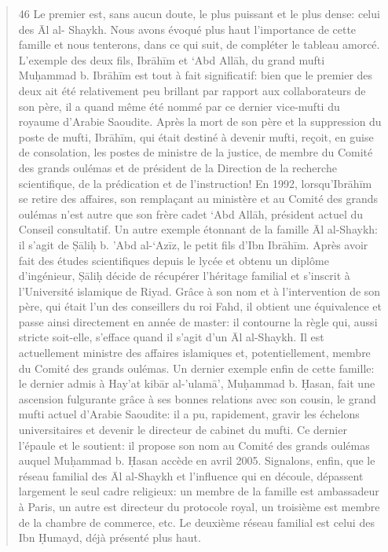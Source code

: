 \begin{quote}
46 Le premier est, sans aucun doute, le plus puissant et le plus dense:
celui des Āl al- Shaykh. Nous avons évoqué plus haut l'importance de
cette famille et nous tenterons, dans ce qui suit, de compléter le
tableau amorcé. L'exemple des deux fils, Ibrāhīm et `Abd Allāh, du grand
mufti Muḥammad b. Ibrāhīm est tout à fait significatif: bien que le
premier des deux ait été relativement peu brillant par rapport aux
collaborateurs de son père, il a quand même été nommé par ce dernier
vice-mufti du royaume d'Arabie Saoudite. Après la mort de son père et la
suppression du poste de mufti, Ibrāhīm, qui était destiné à devenir
mufti, reçoit, en guise de consolation, les postes de ministre de la
justice, de membre du Comité des grands oulémas et de président de la
Direction de la recherche scientifique, de la prédication et de
l'instruction! En 1992, lorsqu'Ibrāhīm se retire des affaires, son
remplaçant au ministère et au Comité des grands oulémas n'est autre que
son frère cadet `Abd Allāh, président actuel du Conseil consultatif. Un
autre exemple étonnant de la famille Āl al-Shaykh: il s'agit de Ṣāliḥ b.
'Abd al-`Azīz, le petit fils d'Ibn Ibrāhīm. Après avoir fait des études
scientifiques depuis le lycée et obtenu un diplôme d'ingénieur, Ṣāliḥ
décide de récupérer l'héritage familial et s'inscrit à l'Université
islamique de Riyad. Grâce à son nom et à l'intervention de son père, qui
était l'un des conseillers du roi Fahd, il obtient une équivalence et
passe ainsi directement en année de master: il contourne la règle qui,
aussi stricte soit-elle, s'efface quand il s'agit d'un Āl al-Shaykh. Il
est actuellement ministre des affaires islamiques et, potentiellement,
membre du Comité des grands oulémas. Un dernier exemple enfin de cette
famille: le dernier admis à Hay'at kibār al-'ulamā', Muḥammad b. Ḥasan,
fait une ascension fulgurante grâce à ses bonnes relations avec son
cousin, le grand mufti actuel d'Arabie Saoudite: il a pu, rapidement,
gravir les échelons universitaires et devenir le directeur de cabinet du
mufti. Ce dernier l'épaule et le soutient: il propose son nom au Comité
des grands oulémas auquel Muḥammad b. Ḥasan accède en avril 2005.
Signalons, enfin, que le réseau familial des Āl al-Shaykh et l'influence
qui en découle, dépassent largement le seul cadre religieux: un membre
de la famille est ambassadeur à Paris, un autre est directeur du
protocole royal, un troisième est membre de la chambre de commerce, etc.
Le deuxième réseau familial est celui des Ibn Ḥumayd, déjà présenté plus
haut.


\end{quote}
